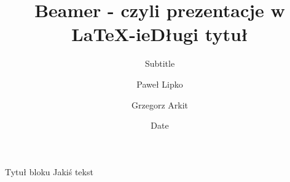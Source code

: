 \documentclass[a4paper, 11pt]{beamer}
\begin{document}
%
\title{Beamer - czyli prezentacje w \LaTeX -ie}
\author{Paweł Lipko}
%

\begin{frame}
	\title[Krótki tytuł]{Długi tytuł}
\subtitle{Subtitle}
\author[GA]{Grzegorz Arkit}
\subject{Subject}
\date{Date}

\begin{block}{Tytuł bloku}
Jakiś tekst
\end{block}


\end{frame}
\end{document}
